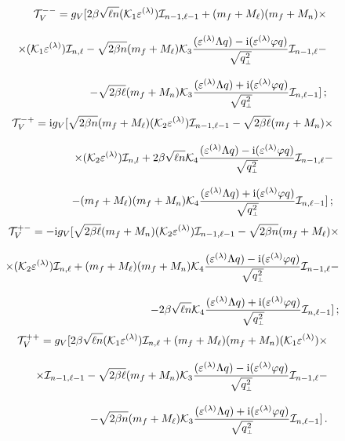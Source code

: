 \begin{eqnarray}
\nonumber
&&{\cal T}^{--}_V  = g_V [ 2\beta\sqrt{\ell n} ({\cal K}_1 \varepsilon^{(\lambda)}) {\cal I}_{n-1,\ell-1} +
(m_f+M_\ell)(m_f+M_n)\times
\\[3mm]
\label{V--}
&&\times({\cal K}_1 \varepsilon^{(\lambda)}) {\cal I}_{n,\ell} -
\sqrt{2\beta n} (m_f+M_\ell) {\cal K}_3 \frac{(\varepsilon^{(\lambda)}\Lambda q) - 
\mathrm{i} (\varepsilon^{(\lambda)} \varphi q)}{\sqrt{q^2_{\mbox{\tiny $\bot$}}}} {\cal I}_{n-1,\ell} -
\\[3mm]
\nonumber
&& - \sqrt{2\beta \ell} (m_f+M_n) {\cal K}_3 
\frac{(\varepsilon^{(\lambda)}\Lambda q) + \mathrm{i} (\varepsilon^{(\lambda)}\varphi q)}{\sqrt{q^2_{\mbox{\tiny $\bot$}}}} {\cal I}_{n,\ell-1}] \, ;
\end{eqnarray}
%
\begin{eqnarray}
\nonumber
&&{\cal T}^{-+}_V = \mathrm{i} g_V [\sqrt{2\beta n} (m_f+M_\ell) ({\cal K}_2 \varepsilon^{(\lambda)}) 
{\cal I}_{n-1,\ell-1} - 
 \sqrt{2\beta \ell} (m_f+M_n) \times
\\[3mm]
\label{eq:tV-+}
&&\times  ({\cal K}_2 \varepsilon^{(\lambda)}) 
{\cal I}_{n,l} + 2\beta\sqrt{\ell n} {\cal K}_4 
\frac{(\varepsilon^{(\lambda)}\Lambda q) - \mathrm{i} (\varepsilon^{(\lambda)} \varphi q)}{\sqrt{q^2_{\mbox{\tiny $\bot$}}}} {\cal I}_{n-1,\ell} -
\\[3mm]
\nonumber
&&- (m_f+M_\ell)(m_f+M_n) {\cal K}_4 
\frac{(\varepsilon^{(\lambda)}\Lambda q) + \mathrm{i} (\varepsilon^{(\lambda)}\varphi q)}{\sqrt{q^2_{\mbox{\tiny $\bot$}}}} {\cal I}_{n,\ell-1}]  \, ;
\end{eqnarray}
%
\begin{eqnarray}
\nonumber
&&{\cal T}^{+-}_V = -\mathrm{i} g_V [\sqrt{2\beta \ell} (m_f+M_n) ({\cal K}_2 \varepsilon^{(\lambda)}) 
{\cal I}_{n-1,\ell-1} - 
 \sqrt{2\beta n} (m_f+M_\ell) \times
\\[3mm]
\label{eq:tV+-}
&&\times  ({\cal K}_2 \varepsilon^{(\lambda)}) 
{\cal I}_{n,\ell} + (m_f+M_\ell)(m_f+M_n) {\cal K}_4 
\frac{(\varepsilon^{(\lambda)}\Lambda q) - \mathrm{i} (\varepsilon^{(\lambda)} \varphi q)}{\sqrt{q^2_{\mbox{\tiny $\bot$}}}} {\cal I}_{n-1,\ell} -
\\[3mm]
\nonumber
&&- 2\beta\sqrt{\ell n} {\cal K}_4 
\frac{(\varepsilon^{(\lambda)}\Lambda q) + \mathrm{i} (\varepsilon^{(\lambda)} \varphi q)}{\sqrt{q^2_{\mbox{\tiny $\bot$}}}} {\cal I}_{n,\ell-1}]  \, ;
\end{eqnarray}
%
\begin{eqnarray}
\nonumber
&&{\cal T}^{++}_V  = g_V [2\beta\sqrt{\ell n} ({\cal K}_1 \varepsilon^{(\lambda)}) {\cal I}_{n,\ell} +
 (m_f+M_\ell)(m_f+M_n) ({\cal K}_1 \varepsilon^{(\lambda)}) \times
\\[3mm]
\label{eq:tV++} 
&&\times  {\cal I}_{n-1,\ell-1} - \sqrt{2\beta \ell} (m_f+M_n) {\cal K}_3 
\frac{(\varepsilon^{(\lambda)}\Lambda q) - \mathrm{i} (\varepsilon^{(\lambda)}\varphi q)}{\sqrt{q^2_{\mbox{\tiny $\bot$}}}} {\cal I}_{n-1,\ell} -
\\[3mm]
\nonumber
&&- \sqrt{2\beta n} (m_f+M_\ell) {\cal K}_3 
\frac{(\varepsilon^{(\lambda)}\Lambda q) + \mathrm{i} (\varepsilon^{(\lambda)} \varphi q)}{\sqrt{q^2_{\mbox{\tiny $\bot$}}}} {\cal I}_{n,\ell-1}] \, .
\end{eqnarray}

